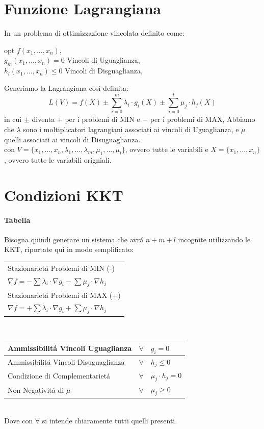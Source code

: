 \documentclass[12pt, a4paper, openany]{book}
\begin{document}
\section{Funzione Lagrangiana}
In un problema di ottimizzazione vincolata definito come:
\begin{center}
	opt $f(x_1,...,x_n)$,
	\\
	$g_m(x_1,...,x_n) = 0$ Vincoli di Uguaglianza,
	\\
	$h_l(x_1,...,x_n) \leq 0$ Vincoli di Disguaglianza,
\end{center}
Generiamo la Lagrangiana cosí definita:
\[
	L(V) = f(X) \pm \sum_{i=0}^{m} \lambda_i \cdot g_i(X) \pm \sum_{j=0}^{l} \mu_j \cdot h_j(X)
\]
in cui $\pm$ diventa $+$ per i problemi di MIN e $-$ per i problemi di MAX,
Abbiamo che $\lambda$ sono i moltiplicatori lagrangiani associati ai vincoli di Uguaglianza, e $\mu$ quelli associati ai vincoli di Disuguaglianza.
\\\small{con $V=\{x_1,...,x_n,\lambda_1,...,\lambda_m, \mu_1,...,\mu_l\}$, ovvero tutte le variabili e $X=\{x_1,...,x_n\}$, ovvero tutte le variabili origniali.}

\section{Condizioni KKT}
\paragraph{Tabella}
Bisogna quindi generare un sistema che avrá $n+m+l$ incognite utilizzando le KKT,
riportate qui in modo semplificato:\\
\begin{tabularx}{\textwidth}{|Y|}
	\hline
	Stazionarietá Problemi di MIN (-)                                             \\
	$ \nabla f = - \sum \lambda_i \cdot \nabla g_i - \sum \mu_j \cdot \nabla h_j$ \\
	\hline \hline
	Stazionarietá Problemi di MAX (+)                                             \\
	$ \nabla f = + \sum \lambda_i \cdot \nabla g_i + \sum \mu_j \cdot \nabla h_j$ \\
	\hline
\end{tabularx}\\
\begin{tabularx}{\textwidth}{|l|cY|}
	\hline
	Ammissibilitá Vincoli Uguaglianza    & $\forall$  & $ g_i = 0$             \\
	\hline
	Ammissibilitá Vincoli Disuguaglianza & $ \forall$ & $ h_j\leq 0$           \\
	\hline
	Condizione di Complementarietá       & $\forall$  & $ \mu_j \cdot h_j = 0$ \\
	\hline
	Non Negativitá di $\mu$              & $\forall $ & $ \mu_j \geq 0$        \\
	\hline
\end{tabularx}
\\Dove con $\forall$ si intende chiaramente tutti quelli presenti.
\end{document}
